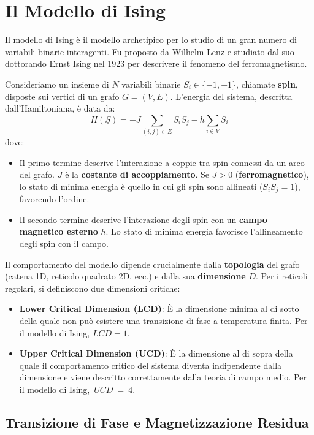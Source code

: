 \newpage
\section{Il Modello di Ising}

Il modello di Ising è il modello archetipico per lo studio di un gran numero di variabili binarie interagenti. Fu proposto da Wilhelm Lenz e studiato dal suo dottorando Ernst Ising nel 1923 per descrivere il fenomeno del ferromagnetismo.



Consideriamo un insieme di $N$ variabili binarie $S_i \in \{-1, +1\}$, chiamate \textbf{spin}, disposte sui vertici di un grafo $G=(V, E)$. L'energia del sistema, descritta dall'Hamiltoniana, è data da:
\begin{equation}
H(\underline{S}) = -J \sum_{(i,j) \in E} S_i S_j - h \sum_{i \in V} S_i
\end{equation}
dove:
\begin{itemize}
    \item Il primo termine descrive l'interazione a coppie tra spin connessi da un arco del grafo. $J$ è la \textbf{costante di accoppiamento}. Se $J>0$ (\textbf{ferromagnetico}), lo stato di minima energia è quello in cui gli spin sono allineati ($S_i S_j=1$), favorendo l'ordine.
    \item Il secondo termine descrive l'interazione degli spin con un \textbf{campo magnetico esterno} $h$. Lo stato di minima energia favorisce l'allineamento degli spin con il campo.
\end{itemize}

Il comportamento del modello dipende crucialmente dalla \textbf{topologia} del grafo (catena 1D, reticolo quadrato 2D, ecc.) e dalla sua \textbf{dimensione} $D$. Per i reticoli regolari, si definiscono due dimensioni critiche:
\begin{itemize}
    \item \textbf{Lower Critical Dimension (LCD)}: È la dimensione minima al di sotto della quale non può esistere una transizione di fase a temperatura finita. Per il modello di Ising, $LCD=1$.
    \item \textbf{Upper Critical Dimension (UCD)}: È la dimensione al di sopra della quale il comportamento critico del sistema diventa indipendente dalla dimensione e viene descritto correttamente dalla teoria di campo medio. Per il modello di Ising,~$UCD~=~4$.
\end{itemize}

\subsection{Transizione di Fase e Magnetizzazione Residua}

